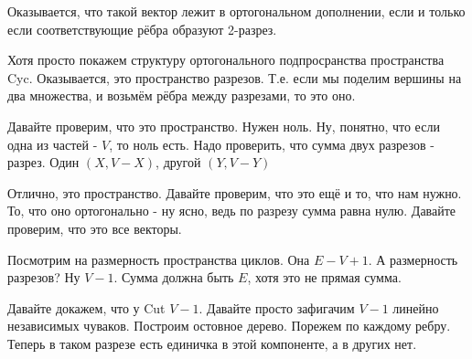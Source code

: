\documentclass[10pt,a4paper]{article}
\begin{document}
Оказывается, что такой вектор лежит в ортогональном дополнении, если и только если соответствующие рёбра образуют 2-разрез.

Хотя просто покажем структуру ортогонального подпросранства пространства Cyc. Оказывается, это пространство разрезов. Т.е. если мы поделим вершины на два множества, и возьмём рёбра между разрезами, то это оно.

Давайте проверим, что это пространство. Нужен ноль. Ну, понятно, что если одна из частей - $V$, то ноль есть. Надо проверить, что сумма двух разрезов - разрез. Один $(X,V-X)$, другой $(Y,V-Y) $

Отлично, это пространство. Давайте проверим, что это ещё и то, что нам нужно. То, что оно ортогонально - ну ясно, ведь по разрезу сумма равна нулю. Давайте проверим, что это все векторы.

Посмотрим на размерность пространства циклов. Она $E - V + 1$. А размерность разрезов? Ну $V-1$. Сумма должна быть $E$, хотя это не прямая сумма.

Давайте докажем, что у Cut $V-1$. Давайте просто зафигачим $V-1$ линейно независимых чуваков. Построим остовное дерево. Порежем по каждому ребру. Теперь в таком разрезе есть единичка в этой компоненте, а в других нет.
\end{document}
